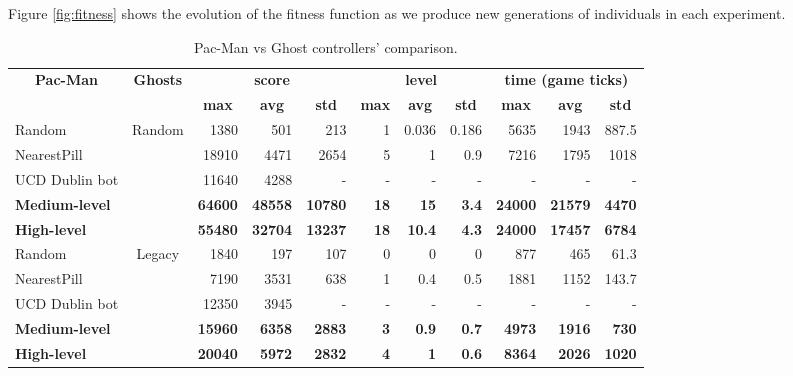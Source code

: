 \documentclass{llncs}
\newcommand{\paco}{Pac-Man }
\begin{document}
Figure \ref{fig:fitness} shows the evolution of the fitness function as we produce new generations of individuals in each experiment.

\begin{table}[]
\centering
\caption{\paco vs Ghost controllers' comparison.}
\label{table:single_obj}
\begin{tabular}{|l|c|r|r|r|r|r|r|r|r|r|}
\hline
\multicolumn{1}{|c|}{\multirow{2}{*}{\textbf{\paco}}} & \multirow{2}{*}{\textbf{Ghosts}} & \multicolumn{3}{c|}{\textbf{score}} & \multicolumn{3}{c|}{\textbf{level}} & \multicolumn{3}{c|}{\textbf{time (game ticks)}} \\ \cline{3-11} 
\multicolumn{1}{|c|}{} &  & \multicolumn{1}{c|}{\textbf{max}} & \multicolumn{1}{c|}{\textbf{avg}} & \multicolumn{1}{c|}{\textbf{std}} & \multicolumn{1}{c|}{\textbf{max}} & \multicolumn{1}{c|}{\textbf{avg}} & \multicolumn{1}{c|}{\textbf{std}} & \multicolumn{1}{c|}{\textbf{max}} & \multicolumn{1}{c|}{\textbf{avg}} & \multicolumn{1}{c|}{\textbf{std}} \\ \hline
Random &  \multirow{5}{*}{Random} & 1380 & 501 & 213 & 1 & 0.036 & 0.186 & 5635 & 1943 & 887.5 \\ \cline{1-1} \cline{3-11} 
NearestPill &  & 18910 & 4471 & 2654 & 5 & 1 & 0.9 & 7216 & 1795 & 1018 \\ \cline{1-1} \cline{3-11} 
UCD Dublin bot\cite{galvan2010evolving} &  & 11640 & 4288 & - & - & - & - & - & - & - \\ \cline{1-1} \cline{3-11} 
\textbf{Medium-level} &  & \textbf{64600} & \textbf{48558} & \textbf{10780} & \textbf{18} & \textbf{15} & \textbf{3.4} & \textbf{24000} & \textbf{21579} & \textbf{4470} \\ \cline{1-1} \cline{3-11} 
\textbf{High-level} &  & \textbf{55480} & \textbf{32704} & \textbf{13237} & \textbf{18} & \textbf{10.4} & \textbf{4.3} & \textbf{24000} & \textbf{17457} & \textbf{6784} \\ \hline
Random & \multirow{5}{*}{Legacy} & 1840 & 197 & 107 & 0 & 0 & 0 & 877 & 465 & 61.3 \\ \cline{1-1} \cline{3-11} 
NearestPill &  & 7190 & 3531 & 638 & 1 & 0.4 & 0.5 & 1881 & 1152 & 143.7 \\ \cline{1-1} \cline{3-11} 
UCD Dublin bot\cite{galvan2010evolving} &  & 12350 & 3945 & - & - & - & - & - & - & - \\ \cline{1-1} \cline{3-11} 
\textbf{Medium-level} &  & \textbf{15960} & \textbf{6358} & \textbf{2883} & \textbf{3} & \textbf{0.9} & \textbf{0.7} & \textbf{4973} & \textbf{1916} & \textbf{730} \\ \cline{1-1} \cline{3-11} 
\textbf{High-level} &  & \textbf{20040} & \textbf{5972} & \textbf{2832} & \textbf{4} & \textbf{1} & \textbf{0.6} & \textbf{8364} & \textbf{2026} & \textbf{1020} \\ \hline
\end{tabular}
\end{table}
\end{document}
